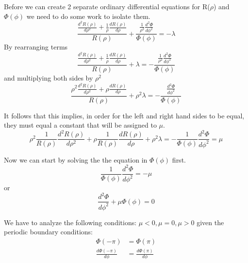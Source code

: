 \documentclass[11pt]{article}
\begin{document}
Before we can create 2 separate ordinary differential equations for
R(\(\rho\)) and \(\Phi(\phi)\) we need to do some work to isolate them.
\begin{equation}
\frac {\frac {d^2 R(\rho)}{d \rho^2} + \frac{1}{\rho} \frac{d R(\rho)}{d \rho}} {R(\rho) }  + 
\frac {\frac{1}{\rho^2} \frac {d^2 \Phi}{d \phi^2} } {\Phi(\phi)} = - \lambda
\end{equation} By rearranging terms \begin{equation}
\frac {\frac {d^2 R(\rho)}{d \rho^2} + \frac{1}{\rho} \frac{d R(\rho)}{d \rho}}{R(\rho)}  + 
\lambda = - \frac{\frac{1}{\rho^2} \frac{d^2 \Phi}{d \phi^2}}{\Phi(\phi)} 
\end{equation} and multiplying both sides by \(\rho^2\) \begin{equation}
\frac {\rho^2 \frac {d^2 R(\rho)}{d \rho^2} + {\rho} \frac{d R(\rho)}{d \rho}} {R(\rho)}  + 
\rho^2 \lambda = - \frac{\frac {d^2 \Phi}{d \phi^2}}{\Phi(\phi)}
\end{equation}

It follows that this implies, in order for the left and right hand sides
to be equal, they must equal a constant that will be assigned to
\(\mu\). \begin{equation}
\rho^2 \frac {1}{R(\rho)} \frac {d^2 R(\rho)}{d \rho^2} + \rho \frac{1}{R(\rho)} \frac{d R(\rho)}{d \rho}   + 
\rho^2 \lambda = - \frac{1}{\Phi(\phi)} \frac{d^2 \Phi}{d \phi^2}  = \mu
\end{equation}

Now we can start by solving the the equation in \(\Phi(\phi)\) first.
\begin{equation}
\frac{1}{\Phi(\phi)} \frac{d^2 \Phi}{d \phi^2}  = -\mu
\end{equation} or \begin{equation}
\frac{d^2 \Phi}{d \phi^2} + \mu \Phi(\phi) = 0
\end{equation}

We have to analyze the following conditions:
\(\mu < 0, \mu = 0, \mu > 0\) given the periodic boundary conditions:
\begin{equation}
\begin{split}
\Phi(- \pi) &= \Phi( \pi) \\
\frac {d\Phi(- \pi)}{d \phi} & = \frac {d \Phi( \pi)}{d \phi}
\end{split}
\end{equation}
\end{document}
